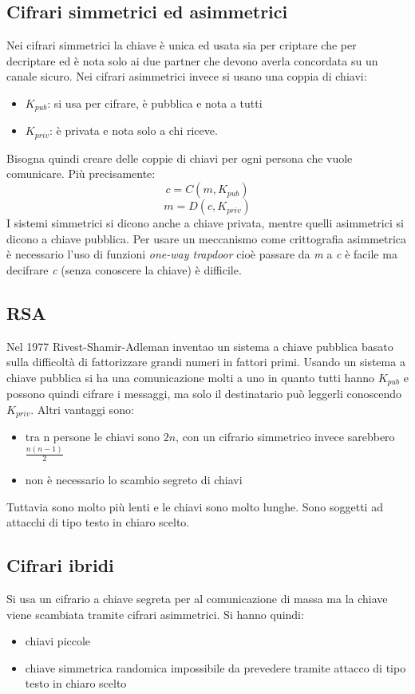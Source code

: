 \subsection{Cifrari simmetrici ed asimmetrici}
Nei cifrari simmetrici la chiave è unica ed usata sia per criptare che per decriptare ed è nota solo ai due partner che devono averla concordata su un canale sicuro.
Nei cifrari asimmetrici invece si usano una coppia di chiavi:
\begin{itemize}
    \item \emph{$K_{pub}$}: si usa per cifrare, è pubblica e nota a tutti
    \item \emph{$K_{priv}$}: è privata e nota solo a chi riceve.
\end{itemize}
Bisogna quindi creare delle coppie di chiavi per ogni persona che vuole comunicare. Più precisamente:
$$ c = C(m, K_{pub}) $$
$$ m = D(c, K_{priv}) $$
I sistemi simmetrici si dicono anche a chiave privata, mentre quelli asimmetrici si dicono a chiave pubblica.
Per usare un meccanismo come crittografia asimmetrica è necessario l'uso di funzioni \emph{one-way trapdoor} cioè passare da \emph{m} a \emph{c} è facile ma decifrare \emph{c} (senza conoscere la chiave) è difficile.

\subsection{RSA}
Nel 1977 Rivest-Shamir-Adleman inventao un sistema a chiave pubblica basato sulla difficoltà di fattorizzare grandi numeri in fattori primi.
Usando un sistema a chiave pubblica si ha una comunicazione molti a uno in quanto tutti hanno $K_{pub}$ e possono quindi cifrare i messaggi, ma solo il destinatario può leggerli conoscendo $K_{priv}$. Altri vantaggi sono:
\begin{itemize}
    \item tra n persone le chiavi sono $2n$, con un cifrario simmetrico invece sarebbero $\frac{n(n-1)}{2}$
    \item non è necessario lo scambio segreto di chiavi
\end{itemize}

Tuttavia sono molto più lenti e le chiavi sono molto lunghe. Sono soggetti ad attacchi di tipo testo in chiaro scelto.

\subsection{Cifrari ibridi}
Si usa un cifrario a chiave segreta per al comunicazione di massa ma la chiave viene scambiata tramite cifrari asimmetrici. Si hanno quindi:
\begin{itemize}
    \item chiavi piccole
    \item chiave simmetrica randomica impossibile da prevedere tramite attacco di tipo testo in chiaro scelto
\end{itemize}

